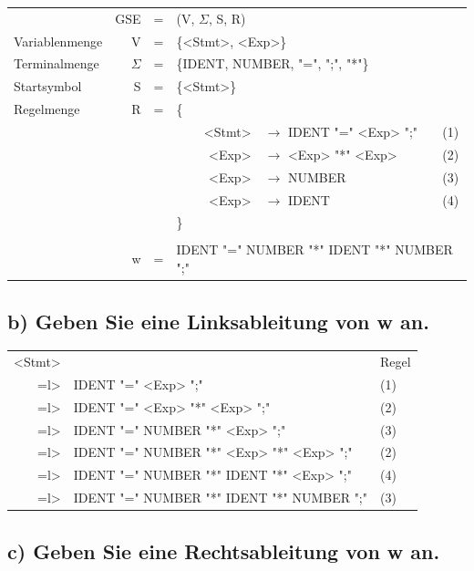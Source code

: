 \documentclass{article}
\begin{document}
\begin{center}
	\begin{tabular}{lrclrlc}
		& GSE & = & \multicolumn{4}{l}{(V, $\Sigma$, S, R)} \\
		Variablenmenge & V & = & \multicolumn{4}{l}{\{<Stmt>, <Exp>\}} \\
		Terminalmenge & $\Sigma$ & = & \multicolumn{4}{l}{\{IDENT, NUMBER, "=", ";", "*"\}} \\
		Startsymbol & S & = & \multicolumn{4}{l}{\{<Stmt>\}} \\
		Regelmenge & R & = & \{ \\
		& & & & <Stmt> & $\rightarrow$ IDENT "=" <Exp> ";" & (1) \\
		& & & & <Exp> & $\rightarrow$ <Exp> "*" <Exp> & (2) \\
		& & & & <Exp> & $\rightarrow$ NUMBER & (3) \\
		& & & & <Exp> & $\rightarrow$ IDENT & (4) \\
		& & & \} \\
		\\
		& w & = & \multicolumn{4}{l}{IDENT "=" NUMBER "*" IDENT "*" NUMBER ";"}
	\end{tabular}
\end{center}

\subsection*{b) Geben Sie eine Linksableitung von w an.}

\begin{center}
	\begin{tabular}{rll}
		<Stmt> & & Regel \\
		=l> & IDENT "=" <Exp> ";" & (1) \\
		=l> & IDENT "=" <Exp> "*" <Exp> ";" & (2)\\
		=l> & IDENT "=" NUMBER "*" <Exp> ";" & (3)\\
		=l> & IDENT "=" NUMBER "*" <Exp> "*" <Exp> ";" & (2)\\
		=l> & IDENT "=" NUMBER "*" IDENT "*" <Exp> ";" & (4)\\
		=l> & IDENT "=" NUMBER "*" IDENT "*" NUMBER ";" & (3)\\
	\end{tabular}
\end{center}

\subsection*{c) Geben Sie eine Rechtsableitung von w an.}
\end{document}
